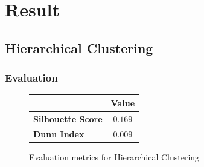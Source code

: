 \section{Result}

\subsection{Hierarchical Clustering}

\subsubsection{Evaluation}

\begin{figure}[H]
    \centering
    \begin{tabular}{|l|c|}
        \hline
        \rowcolor{gray!50}
        & Value \\ \hline
        \textbf{Silhouette Score} & $0.169$ \\ \hline
        \textbf{Dunn Index} & $0.009$ \\ \hline
    \end{tabular}
    \caption{Evaluation metrics for Hierarchical Clustering}\label{fig:Hierarchical_evaluation}
\end{figure}

